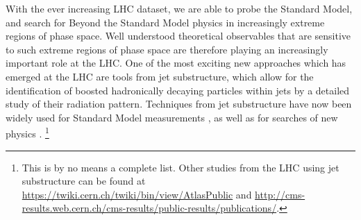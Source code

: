 \documentclass[11pt,letterpaper]{article}
\begin{document}
With the ever increasing LHC dataset, we are able to probe the Standard Model, and search for Beyond the Standard Model physics in increasingly extreme regions of phase space. Well understood theoretical observables that are sensitive to such extreme regions of phase space are therefore playing an increasingly important role at the LHC. One of the most exciting new approaches which has emerged at the LHC are tools from jet substructure, which allow for the identification of boosted hadronically decaying particles within jets by a detailed study of their radiation pattern. Techniques from jet substructure have now been widely used for Standard Model measurements \cite{Chatrchyan:2012sn,CMS:2013cda,Aad:2015cua,Aad:2015lxa,ATLAS-CONF-2015-035,Aad:2015rpa,Aad:2015hna,ATLAS-CONF-2016-002,ATLAS-CONF-2016-039,ATLAS-CONF-2016-034,CMS-PAS-TOP-16-013,CMS-PAS-HIG-16-004}, as well as for searches of new physics  \cite{CMS:2011bqa,Fleischmann:2013woa,Pilot:2013bla,TheATLAScollaboration:2013qia,Chatrchyan:2012ku,CMS-PAS-B2G-14-001,CMS-PAS-B2G-14-002,Khachatryan:2015axa,Khachatryan:2015bma,Aad:2015owa,Aaboud:2016okv,Aaboud:2016trl,Aaboud:2016qgg,ATLAS-CONF-2016-055,ATLAS-CONF-2015-071,ATLAS-CONF-2015-068,CMS-PAS-EXO-16-037,CMS-PAS-EXO-16-040,Khachatryan:2016mdm,CMS-PAS-HIG-16-016,CMS-PAS-B2G-15-003,CMS-PAS-EXO-16-017}. \footnote{This is by no means a complete list.  Other studies from the LHC using jet substructure can be found at \url{https://twiki.cern.ch/twiki/bin/view/AtlasPublic} and \url{http://cms-results.web.cern.ch/cms-results/public-results/publications/}.} 

 
\end{document}
